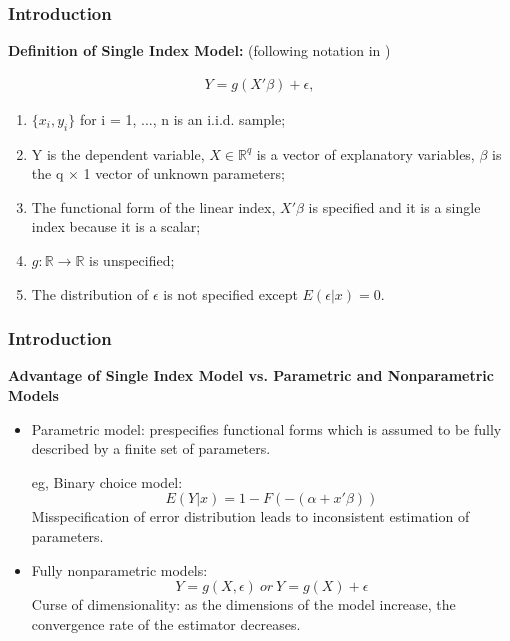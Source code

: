 \documentclass{beamer}
\begin{document}
\begin{frame}[t]
    \frametitle{Introduction}
	 \textbf{Definition of Single Index Model:} 
	 (following notation in \citet{LiRacine07})
 
	 \begin{eqnarray}
		Y = g(X'\beta) + \epsilon,  %
 	 \end{eqnarray}

		\begin{enumerate}
			\item $\{x_i,y_i\}$ for i = 1, ..., n is an i.i.d. sample;
			\item Y is the dependent variable, $X\in \mathbb{R}^{q}$ is a vector of explanatory variables, $\beta$ is the q $\times$ 1 						vector of unknown parameters; 
			\item The functional form of the linear index, $X'\beta$ is specified and it is a single index because it is a scalar;
			\item $g: \mathbb{R} \rightarrow \mathbb{R} $ is unspecified; %
			\item The distribution of $\epsilon$ is not specified except $ E(\epsilon|x) = 0 $.
	   \end{enumerate}

\note{~}      
\end{frame}

\begin{frame}[t]
	\frametitle{Introduction}
	\textbf{Advantage of Single Index Model vs. Parametric and Nonparametric Models}
	\begin{itemize}
	\item Parametric model: prespecifies functional forms which is assumed to be fully described by a finite set of parameters.
			
			eg, Binary choice model: 
			\[E(Y|x) = 1 - F(-(\alpha + x'\beta))\]
			Misspecification of error distribution leads to inconsistent estimation of parameters.
			
	\item Fully nonparametric models: \[Y = g(X, \epsilon)\ or\ Y = g(X) + \epsilon\]
	      Curse of dimensionality: as the dimensions of the model increase, the convergence rate of the estimator decreases.
	
	\end{itemize}
	

\note{~}
\end{frame}
\end{document}

